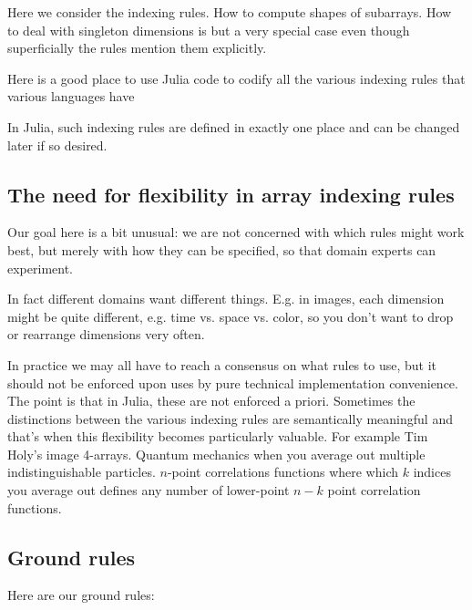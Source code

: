 \documentclass[preprint]{sigplanconf}
\begin{document}


Here we consider the indexing rules. How to compute shapes of subarrays. How
to deal with singleton dimensions is but a very special case even though
superficially the rules mention them explicitly.

Here is a good place to use Julia code to codify all the various indexing
rules that various languages have

In Julia, such indexing rules are defined in exactly one place and can be
changed later if so desired.

\subsection{The need for flexibility in array indexing rules}

Our goal here is a bit unusual: we are not concerned with which rules might
work best, but merely with how they can be specified, so that domain experts
can experiment.

In fact different domains want different things. E.g. in images, each
dimension might be quite different, e.g. time vs. space vs. color, so you
don't want to drop or rearrange dimensions very often.

In practice we may all have to reach a consensus on what rules to use, but it
should not be enforced upon uses by pure technical implementation convenience.
The point is that in Julia, these are not enforced a priori. Sometimes the
distinctions between the various indexing rules are semantically meaningful
and that's when this flexibility becomes particularly valuable. For example
Tim Holy's image 4-arrays. Quantum mechanics when you average out multiple
indistinguishable particles. $n$-point correlations functions where which $k$
indices you average out defines any number of lower-point $n-k$ point
correlation functions.

\subsection{Ground rules}
Here are our ground rules:
\end{document}
